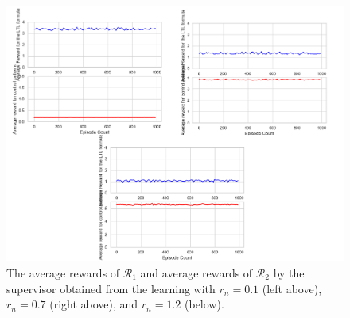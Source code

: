 \documentclass[10 pt, dvipdfmx]{article}
\theoremstyle{definition}
\begin{document}
\begin{figure}[htbp]
   \centering
   \vspace{2mm}
   \includegraphics[width = 12cm]{simulate_TD_v_15000_5000_rn_all_rsink_1000.png}
   \caption{The average rewards of $\mathcal{R}_1$ and average rewards of $\mathcal{R}_2$ by the supervisor obtained from the learning with $r_{n} = 0.1$ (left above), $r_n = 0.7$ (right above), and $r_n = 1.2$ (below).}
   \label{sim1}
\end{figure}
\end{document}

